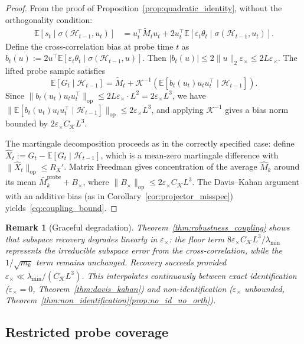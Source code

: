 \documentclass[12pt]{article}
\newcommand{\E}{\mathbb{E}}
\newcommand{\op}{\mathrm{op}}
\newcommand{\cH}{\mathcal{H}}
\newtheorem{remark}{Remark}
\theoremstyle{plain}
\theoremstyle{definition}
\begin{document}
\begin{proof}
From the proof of Proposition~\ref{prop:quadratic_identity}, without the orthogonality condition:
\begin{align*}
\E[s_t \mid \sigma(\cH_{t-1}, u_t)]
&= u_t^\top \widetilde{M}_t u_t + 2u_t^\top \E[\varepsilon_t \theta_t \mid \sigma(\cH_{t-1}, u_t)].
\end{align*}
Define the cross-correlation bias at probe time $t$ as $b_t(u) := 2u^\top \E[\varepsilon_t \theta_t \mid \sigma(\cH_{t-1}, u)]$. Then $|b_t(u)| \le 2\|u\|_2 \varepsilon_\times \le 2L\varepsilon_\times$. The lifted probe sample satisfies
\[
\E[G_t \mid \cH_{t-1}] = \widetilde{M}_t + \mathcal{K}^{-1}(\E[b_t(u_t) u_t u_t^\top \mid \cH_{t-1}]).
\]
Since $\|b_t(u_t) u_t u_t^\top\|_{\op} \le 2L\varepsilon_\times \cdot L^2 = 2\varepsilon_\times L^3$, we have $\|\E[b_t(u_t) u_t u_t^\top \mid \cH_{t-1}]\|_{\op} \le 2\varepsilon_\times L^3$, and applying $\mathcal{K}^{-1}$ gives a bias norm bounded by $2\varepsilon_\times C_{\mathcal{K}} L^3$.

The martingale decomposition proceeds as in the correctly specified case: define $\hat{X}_t := G_t - \E[G_t \mid \cH_{t-1}]$, which is a mean-zero martingale difference with $\|\hat{X}_t\|_{\op} \le R_X'$. Matrix Freedman gives concentration of the average $\widehat{M}_k$ around its mean $\bar{M}_k^{\mathrm{probe}} + B_\times$, where $\|B_\times\|_{\op} \le 2\varepsilon_\times C_{\mathcal{K}} L^3$. The Davis--Kahan argument with an additive bias (as in Corollary~\ref{cor:projector_misspec}) yields~\eqref{eq:coupling_bound}.
\end{proof}

\begin{remark}[Graceful degradation]
\label{rem:graceful}
Theorem~\ref{thm:robustness_coupling} shows that subspace recovery degrades \emph{linearly} in $\varepsilon_\times$: the floor term $8\varepsilon_\times C_{\mathcal{K}} L^3 / \lambda_{\min}$ represents the irreducible subspace error from the cross-correlation, while the $1/\sqrt{m_k}$ term remains unchanged. Recovery succeeds provided $\varepsilon_\times \ll \lambda_{\min} / (C_{\mathcal{K}} L^3)$. This interpolates continuously between exact identification ($\varepsilon_\times = 0$, Theorem~\ref{thm:davis_kahan}) and non-identification ($\varepsilon_\times$ unbounded, Theorem~\ref{thm:non_identification}\ref{prop:no_id_no_orth}).
\end{remark}

\subsection{Restricted probe coverage}
\end{document}
